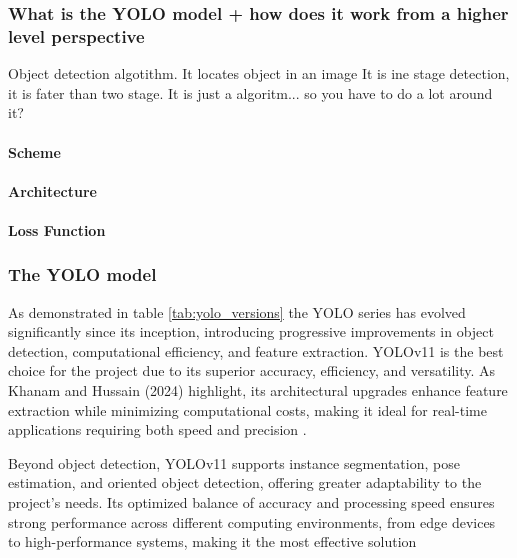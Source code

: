 \documentclass[a4paper,10pt,twocolumn]{article}
\numberwithin{figure}{section}
\numberwithin{table}{section}
\begin{document}
\subsubsection{What is the YOLO model + how does it work from a higher level perspective}
\vspace{0.3cm}

Object detection algotithm. It locates object in an image
It is ine stage detection, it is fater than two stage. 
It is just a algoritm... so you have to do a lot around it?

\paragraph{Scheme}



\paragraph{Architecture}


\paragraph{Loss Function}


\subsubsection{The YOLO model}
\vspace{0.3cm}
As demonstrated in table \ref{tab:yolo_versions} the YOLO series has
 evolved significantly since its inception, introducing progressive improvements
  in object detection, computational efficiency, and feature extraction. 
YOLOv11 is the best choice for the project due to its superior accuracy, 
efficiency, and versatility. As Khanam and Hussain (2024) highlight, 
its architectural upgrades enhance feature extraction while minimizing 
computational costs, making it ideal for real-time applications requiring 
both speed and precision \citep{khanam2024yolov11overviewkeyarchitectural}.

\vspace{0.3cm}
Beyond object detection, YOLOv11 supports instance segmentation, 
pose estimation, and oriented object detection, offering greater adaptability 
to the project’s needs. Its optimized balance of accuracy and processing speed 
ensures strong performance across different computing environments, from edge 
devices to high-performance systems, making it the most effective solution
\end{document}
